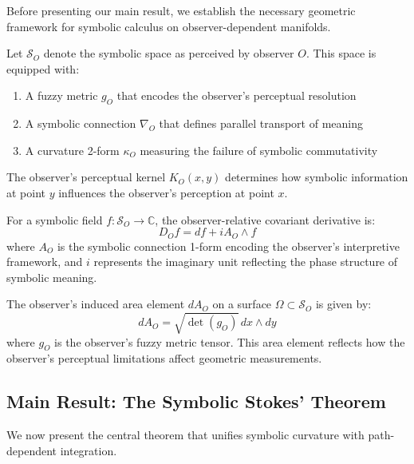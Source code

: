 Before presenting our main result, we establish the necessary geometric framework for symbolic calculus on observer-dependent manifolds.

\begin{definition}
\label{def:bk4_symbolic_space}
Let $\mathcal{S}_O$ denote the symbolic space as perceived by observer $O$. This space is equipped with:
\begin{enumerate}
    \item A fuzzy metric $g_O$ that encodes the observer's perceptual resolution
    \item A symbolic connection $\nabla_O$ that defines parallel transport of meaning
    \item A curvature 2-form $\kappa_O$ measuring the failure of symbolic commutativity
\end{enumerate}
The observer's perceptual kernel $K_O(x,y)$ determines how symbolic information at point $y$ influences the observer's perception at point $x$.
\end{definition}

\begin{definition}
\label{def:bk4_symbolic_covariant}
For a symbolic field $f: \mathcal{S}_O \to \mathbb{C}$, the observer-relative covariant derivative is:
\[
D_O f = df + i A_O \wedge f
\]
where $A_O$ is the symbolic connection 1-form encoding the observer's interpretive framework, and $i$ represents the imaginary unit reflecting the phase structure of symbolic meaning.
\end{definition}

\begin{definition}
\label{def:bk4_induced_area}
The observer's induced area element $dA_O$ on a surface $\Omega \subset \mathcal{S}_O$ is given by:
\[
dA_O = \sqrt{\det(g_O)} \, dx \wedge dy
\]
where $g_O$ is the observer's fuzzy metric tensor. This area element reflects how the observer's perceptual limitations affect geometric measurements.
\end{definition}

\subsection{Main Result: The Symbolic Stokes' Theorem}
\label{subsec:bk4_main_result_stokes}

We now present the central theorem that unifies symbolic curvature with path-dependent integration.

